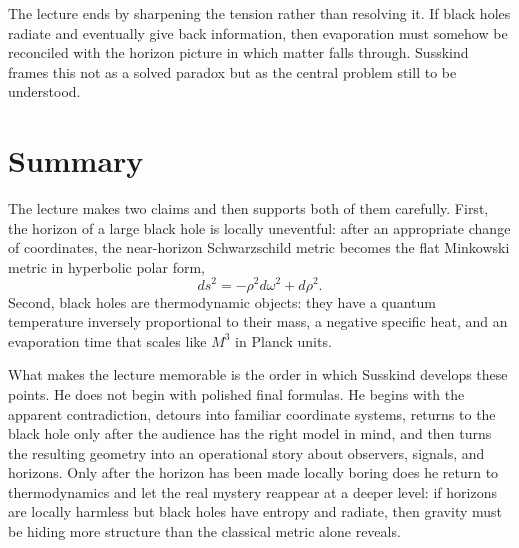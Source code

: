 The lecture ends by sharpening the tension rather than resolving it. If black holes radiate and eventually give back information, then evaporation must somehow be reconciled with the horizon picture in which matter falls through. Susskind frames this not as a solved paradox but as the central problem still to be understood.

\section{Summary}

The lecture makes two claims and then supports both of them carefully. First, the horizon of a large black hole is locally uneventful: after an appropriate change of coordinates, the near-horizon Schwarzschild metric becomes the flat Minkowski metric in hyperbolic polar form,
\[
ds^2 = -\rho^2 d\omega^2 + d\rho^2.
\]
Second, black holes are thermodynamic objects: they have a quantum temperature inversely proportional to their mass, a negative specific heat, and an evaporation time that scales like \(M^3\) in Planck units.

What makes the lecture memorable is the order in which Susskind develops these points. He does not begin with polished final formulas. He begins with the apparent contradiction, detours into familiar coordinate systems, returns to the black hole only after the audience has the right model in mind, and then turns the resulting geometry into an operational story about observers, signals, and horizons. Only after the horizon has been made locally boring does he return to thermodynamics and let the real mystery reappear at a deeper level: if horizons are locally harmless but black holes have entropy and radiate, then gravity must be hiding more structure than the classical metric alone reveals.